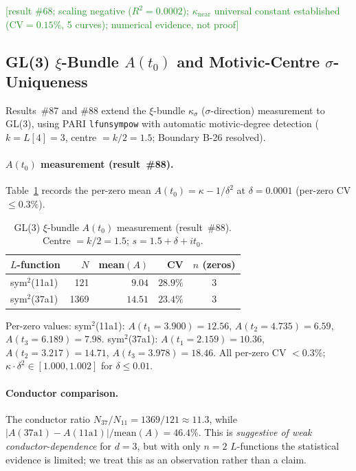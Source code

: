 \documentclass[11pt, a4paper]{article}
\theoremstyle{definition}
\theoremstyle{plain}
\begin{document}
\textcolor{ForestGreen}{[result \#68; scaling negative ($R^2{=}0.0002$);
$\kappa_{\mathrm{near}}$ universal constant established (CV${=}0.15\%$,
5 curves); numerical evidence, not proof]}


\subsection{GL(3) $\xi$-Bundle $A(t_0)$ and Motivic-Centre $\sigma$-Uniqueness}
\label{subsec:gl3_xi_bundle}

Results~\#87 and \#88 extend the $\xi$-bundle $\kappa_\sigma$ ($\sigma$-direction)
measurement to GL(3), using PARI \texttt{lfunsympow} with automatic motivic-degree
detection ($k = L[4] = 3$, centre $= k/2 = 1.5$; Boundary B-26 resolved).

\paragraph{$A(t_0)$ measurement (result~\#88).}
Table~\ref{tab:gl3_xi_bundle} records the per-zero mean $A(t_0) = \kappa - 1/\delta^2$
at $\delta = 0.0001$ (per-zero CV $\leq 0.3\%$).

\begin{table}[ht]
\centering
\caption{GL(3) $\xi$-bundle $A(t_0)$ measurement (result~\#88).
         Centre $= k/2 = 1.5$; $s = 1.5 + \delta + it_0$.
         \label{tab:gl3_xi_bundle}}
\smallskip
\begin{tabular}{lrrrc}
\toprule
$L$-function & $N$ & mean$(A)$ & CV & $n$ (zeros) \\
\midrule
sym$^2$(11a1) & 121  & $9.04$ & $28.9\%$ & 3 \\
sym$^2$(37a1) & 1369 & $14.51$ & $23.4\%$ & 3 \\
\bottomrule
\end{tabular}

\medskip\noindent
{\footnotesize Per-zero values:
sym$^2$(11a1): $A(t_1{=}3.900) = 12.56$, $A(t_2{=}4.735) = 6.59$, $A(t_3{=}6.189) = 7.98$.
sym$^2$(37a1): $A(t_1{=}2.159) = 10.36$, $A(t_2{=}3.217) = 14.71$, $A(t_3{=}3.978) = 18.46$.
All per-zero CV $< 0.3\%$; $\kappa{\cdot}\delta^2 \in [1.000, 1.002]$ for $\delta \leq 0.01$.}
\end{table}

\paragraph{Conductor comparison.}
The conductor ratio $N_{37}/N_{11} = 1369/121 \approx 11.3$, while
$|A(\mathrm{37a1}) - A(\mathrm{11a1})| / \mathrm{mean}(A) = 46.4\%$.
This is \emph{suggestive of weak conductor-dependence} for $d = 3$,
but with only $n = 2$ $L$-functions the statistical evidence is limited;
we treat this as an observation rather than a claim.
\end{document}
